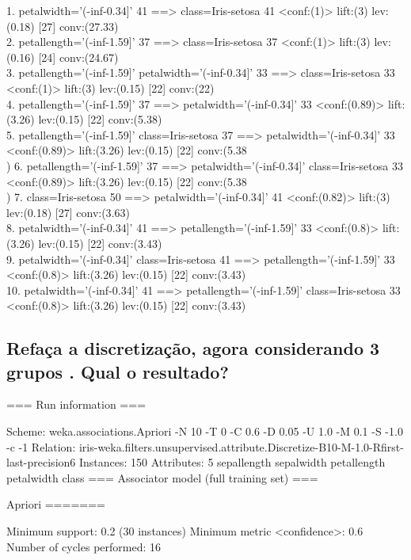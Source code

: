 \documentclass[12pt]{article}
\begin{document}
 1. petalwidth='(-inf-0.34]' 41 ==> class=Iris-setosa 41    <conf:(1)> lift:(3) lev:(0.18) [27] conv:(27.33)\\
 2. petallength='(-inf-1.59]' 37 ==> class=Iris-setosa 37    <conf:(1)> lift:(3) lev:(0.16) [24] conv:(24.67)\\
 3. petallength='(-inf-1.59]' petalwidth='(-inf-0.34]' 33 ==> class=Iris-setosa 33    <conf:(1)> lift:(3) lev:(0.15) [22] conv:(22)\\
 4. petallength='(-inf-1.59]' 37 ==> petalwidth='(-inf-0.34]' 33    <conf:(0.89)> lift:(3.26) lev:(0.15) [22] conv:(5.38)\\
 5. petallength='(-inf-1.59]' class=Iris-setosa 37 ==> petalwidth='(-inf-0.34]' 33    <conf:(0.89)> lift:(3.26) lev:(0.15) [22] conv:(5.38\\)
 6. petallength='(-inf-1.59]' 37 ==> petalwidth='(-inf-0.34]' class=Iris-setosa 33    <conf:(0.89)> lift:(3.26) lev:(0.15) [22] conv:(5.38\\)
 7. class=Iris-setosa 50 ==> petalwidth='(-inf-0.34]' 41    <conf:(0.82)> lift:(3) lev:(0.18) [27] conv:(3.63)\\
 8. petalwidth='(-inf-0.34]' 41 ==> petallength='(-inf-1.59]' 33    <conf:(0.8)> lift:(3.26) lev:(0.15) [22] conv:(3.43)\\
 9. petalwidth='(-inf-0.34]' class=Iris-setosa 41 ==> petallength='(-inf-1.59]' 33    <conf:(0.8)> lift:(3.26) lev:(0.15) [22] conv:(3.43)\\
10. petalwidth='(-inf-0.34]' 41 ==> petallength='(-inf-1.59]' class=Iris-setosa 33    <conf:(0.8)> lift:(3.26) lev:(0.15) [22] conv:(3.43)\\


\subsection{Refaça a discretização, agora considerando 3 grupos . Qual o resultado?}
=== Run information ===

Scheme:       weka.associations.Apriori -N 10 -T 0 -C 0.6 -D 0.05 -U 1.0 -M 0.1 -S -1.0 -c -1
Relation:     iris-weka.filters.unsupervised.attribute.Discretize-B10-M-1.0-Rfirst-last-precision6
Instances:    150
Attributes:   5
              sepallength
              sepalwidth
              petallength
              petalwidth
              class
=== Associator model (full training set) ===


Apriori
=======

Minimum support: 0.2 (30 instances)
Minimum metric <confidence>: 0.6
Number of cycles performed: 16
\end{document}
